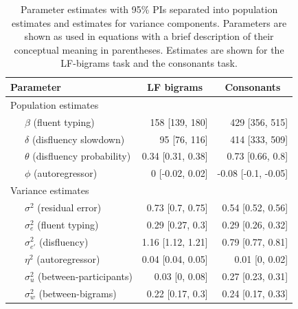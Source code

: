 \documentclass[
  english,
  man,mask,floatsintext]{apa7}
\begin{document}
\begin{table}[bp!]

\begin{center}
\begin{threeparttable}

\caption{\label{tab:modelparameters}Parameter estimates with 95\% PIs separated into population estimates and estimates for variance components. Parameters are shown as used in equations with a brief description of their conceptual meaning in parentheses. Estimates are shown for the LF-bigrams task and the consonants task.}

\begin{tabular}{lrr}
\toprule
Parameter & \multicolumn{1}{c}{LF bigrams} & \multicolumn{1}{c}{Consonants}\\
\midrule
Population estimates &  & \\
\ \ \ $\beta$ (fluent typing) & 158 [139, 180] & 429 [356, 515]\\
\ \ \ $\delta$ (disfluency slowdown) & 95 [76, 116] & 414 [333, 509]\\
\ \ \ $\theta$ (disfluency probability) & 0.34 [0.31, 0.38] & 0.73 [0.66, 0.8]\\
\ \ \ $\phi$ (autoregressor) & 0 [-0.02, 0.02] & -0.08 [-0.1, -0.05]\\
Variance estimates &  & \\
\ \ \ $\sigma^2$ (residual error) & 0.73 [0.7, 0.75] & 0.54 [0.52, 0.56]\\
\ \ \ $\sigma_e^2$ (fluent typing) & 0.29 [0.27, 0.3] & 0.29 [0.26, 0.32]\\
\ \ \ $\sigma_{e'}^2$ (disfluency) & 1.16 [1.12, 1.21] & 0.79 [0.77, 0.81]\\
\ \ \ $\eta^2$ (autoregressor) & 0.04 [0.04, 0.05] & 0.01 [0, 0.02]\\
\ \ \ $\sigma_u^2$ (between-participants) & 0.03 [0, 0.08] & 0.27 [0.23, 0.31]\\
\ \ \ $\sigma_w^2$ (between-bigrams) & 0.22 [0.17, 0.3] & 0.24 [0.17, 0.33]\\
\bottomrule
\end{tabular}

\end{threeparttable}
\end{center}

\end{table}
\end{document}
